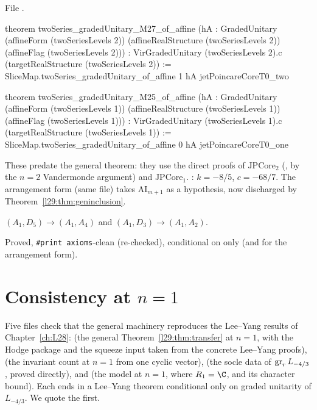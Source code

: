 \noindent File .
\begin{leancode}
theorem twoSeries_gradedUnitary_M27_of_affine
    (hA : GradedUnitary (affineForm (twoSeriesLevels 2))
      (affineRealStructure (twoSeriesLevels 2)) (affineFlag (twoSeriesLevels 2))) :
    VirGradedUnitary (twoSeriesLevels 2).c (targetRealStructure (twoSeriesLevels 2)) :=
  SliceMap.twoSeries_gradedUnitary_of_affine 1 hA jetPoincareCoreT0_two

theorem twoSeries_gradedUnitary_M25_of_affine
    (hA : GradedUnitary (affineForm (twoSeriesLevels 1))
      (affineRealStructure (twoSeriesLevels 1)) (affineFlag (twoSeriesLevels 1))) :
    VirGradedUnitary (twoSeriesLevels 1).c (targetRealStructure (twoSeriesLevels 1)) :=
  SliceMap.twoSeries_gradedUnitary_of_affine 0 hA jetPoincareCoreT0_one
\end{leancode}

\begin{dictionary}
These predate the general theorem: they use the direct proofs of $\mathrm{JPCore}_2$ (,
by the $n=2$ Vandermonde argument) and $\mathrm{JPCore}_1$. : $k=-8/5$, $c=-68/7$. The arrangement
form  (same file) takes $\mathrm{AI}_{m+1}$ as a hypothesis, now
discharged by Theorem~\ref{l29:thm:geninclusion}.
\end{dictionary}

\begin{physics}
$(A_1,D_5)\to(A_1,A_4)$ and $(A_1,D_3)\to(A_1,A_2)$.
\end{physics}

\begin{status}
Proved, \texttt{\#print axioms}-clean (re-checked), conditional on  only (and  for the arrangement
form).
\end{status}

\section{Consistency at \texorpdfstring{$n=1$}{n=1}}\label{l29:sec:leeyang}

Five files check that the general machinery reproduces the Lee--Yang results of Chapter~\ref{ch:L28}:
 (the general Theorem~\ref{l29:thm:transfer} at $n=1$, with the Hodge package and the squeeze
input taken from the concrete Lee--Yang proofs),  (the invariant count at $n=1$ from one
cyclic vector),  (the socle data of $\operatorname{gr}_rL_{-4/3}$, proved directly),
 and  (the model at $n=1$, where $R_1=\C$, and its
character bound). Each ends in a Lee--Yang theorem conditional only on graded unitarity of $L_{-4/3}$. We quote the first.

